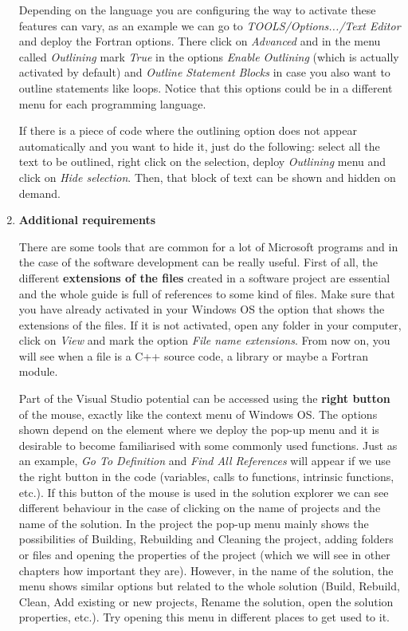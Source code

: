 \begin{enumerate}
    Depending on the language you are configuring the way to activate these features can vary, as an example we can go to \textit{TOOLS/Options.../Text Editor} and deploy the Fortran options. There click on \textit{Advanced} and in the menu called \textit{Outlining} mark \textit{True} in the options \textit{Enable Outlining} (which is actually activated by default) and \textit{Outline Statement Blocks} in case you also want to outline statements like loops. Notice that this options could be in a different menu for each programming language.
    
    If there is a piece of code where the outlining option does not appear automatically and you want to hide it, just do the following: select all the text to be outlined, right click on the selection, deploy \textit{Outlining} menu and click on \textit{Hide selection}. Then, that block of text can be shown and hidden on demand. 
    
    
    \item \textbf{Additional requirements}
    
    There are some tools that are common for a lot of Microsoft programs and in the case of the software development can be really useful. First of all, the different \textbf{extensions of the files} created in a software project are essential and the whole guide is full of references to some kind of files. Make sure that you have already activated in your Windows OS the option that shows the extensions of the files. If it is not activated, open any folder in your computer, click on \textit{View} and mark the option \textit{File name extensions}. From now on, you will see when a file is a C++ source code, a library or maybe a Fortran module.
    
    Part of the Visual Studio potential can be accessed using the \textbf{right button} of the mouse, exactly like the context menu of Windows OS. The options shown depend on the element where we deploy the pop-up menu and it is desirable to become familiarised with some commonly used functions. Just as an example, \textit{Go To Definition} and \textit{Find All References} will appear if we use the right button in the code (variables, calls to functions, intrinsic functions, etc.). If this button of the mouse is used in the solution explorer we can see different behaviour in the case of clicking on the name of projects and  the name of the solution. In the project the pop-up menu mainly shows the possibilities of Building, Rebuilding and Cleaning the project, adding folders or files and opening the properties of the project (which we will see in other chapters how important they are). However, in the name of the solution, the menu shows similar options but related to the whole solution (Build, Rebuild, Clean, Add existing or new projects, Rename the solution, open the solution properties, etc.). Try opening this menu in different places to get used to it.
    

\end{enumerate}
